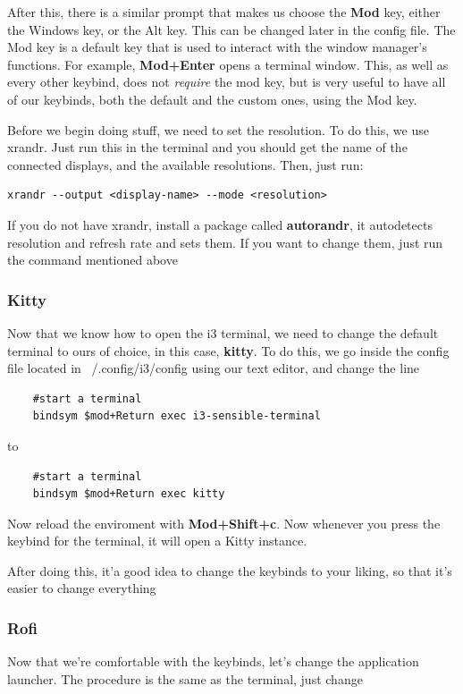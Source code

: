 \vspace{\baselineskip}

After this, there is a similar prompt that makes us choose the \textbf{Mod} key, either the Windows key, or the Alt key. This can be changed later in the config file. The Mod key is a default key that is used to interact with the window manager's functions. For example, \textbf{Mod+Enter} opens a terminal window. This, as well as every other keybind, does not \emph{require} the mod key, but is very useful to have all of our keybinds, both the default and the custom ones, using the Mod key.

\vspace{\baselineskip}

Before we begin doing stuff, we need to set the resolution. To do this, we use xrandr. Just run this in the terminal and you should get the name of the connected displays, and the available resolutions. Then, just run:

\begin{lstlisting}
xrandr --output <display-name> --mode <resolution> 
\end{lstlisting}

If you do not have xrandr, install a package called \textbf{autorandr}, it autodetects resolution and refresh rate and sets them. If you want to change them, just run the command mentioned above

\subsubsection{Kitty}
Now that we know how to open the i3 terminal, we need to change the default terminal to ours of choice, in this case, \textbf{kitty}. To do this, we go inside the config file located in ~/.config/i3/config using our text editor, and change the line
\begin{lstlisting}
    #start a terminal
    bindsym $mod+Return exec i3-sensible-terminal
\end{lstlisting}
to
\begin{lstlisting}
    #start a terminal
    bindsym $mod+Return exec kitty
\end{lstlisting}
Now reload the enviroment with \textbf{Mod+Shift+c}. Now whenever you press the keybind for the terminal, it will open a Kitty instance.

After doing this, it'a good idea to change the keybinds to your liking, so that it's easier to change everything

\subsubsection{Rofi}
Now that we're comfortable with the keybinds, let's change the application launcher. The procedure is the same as the terminal, just change

